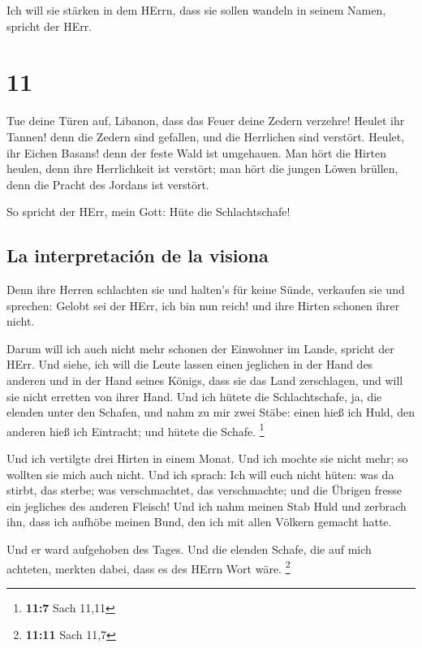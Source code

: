  Ich will sie stärken in dem HErrn, dass sie sollen
wandeln in seinem Namen, spricht der HErr.

\hypertarget{section-10}{%
\section{11}\label{section-10}}

 Tue deine Türen auf, Libanon, dass das Feuer deine Zedern
verzehre!  Heulet ihr Tannen! denn die Zedern sind
gefallen, und die Herrlichen sind verstört. Heulet, ihr Eichen Basans!
denn der feste Wald ist umgehauen.  Man hört die Hirten
heulen, denn ihre Herrlichkeit ist verstört; man hört die jungen Löwen
brüllen, denn die Pracht des Jordans ist verstört.

 So spricht der HErr, mein Gott: Hüte die Schlachtschafe!

\hypertarget{la-interpretaciuxf3n-de-la-visiona}{%
\subsection{La interpretación de la
visiona}\label{la-interpretaciuxf3n-de-la-visiona}}

 Denn ihre Herren schlachten sie und halten's für keine
Sünde, verkaufen sie und sprechen: Gelobt sei der HErr, ich bin nun
reich! und ihre Hirten schonen ihrer nicht.

 Darum will ich auch nicht mehr schonen der Einwohner im
Lande, spricht der HErr. Und siehe, ich will die Leute lassen einen
jeglichen in der Hand des anderen und in der Hand seines Königs, dass
sie das Land zerschlagen, und will sie nicht erretten von ihrer Hand.
 Und ich hütete die Schlachtschafe, ja, die elenden unter
den Schafen, und nahm zu mir zwei Stäbe: einen hieß ich Huld, den
anderen hieß ich Eintracht; und hütete die Schafe. \footnote{\textbf{11:7}
  Sach 11,11}

 Und ich vertilgte drei Hirten in einem Monat. Und ich
mochte sie nicht mehr; so wollten sie mich auch nicht. 
Und ich sprach: Ich will euch nicht hüten: was da stirbt, das sterbe;
was verschmachtet, das verschmachte; und die Übrigen fresse ein
jegliches des anderen Fleisch!  Und ich nahm meinen Stab
Huld und zerbrach ihn, dass ich aufhöbe meinen Bund, den ich mit allen
Völkern gemacht hatte.

 Und er ward aufgehoben des Tages. Und die elenden
Schafe, die auf mich achteten, merkten dabei, dass es des HErrn Wort
wäre. \footnote{\textbf{11:11} Sach 11,7}

